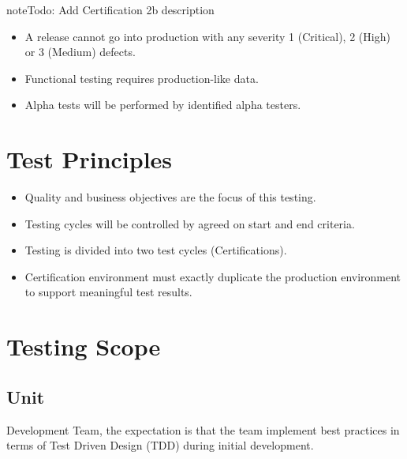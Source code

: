 \documentclass[letterpaper,10pt,english]{sphinxmanual}
\begin{document}
\begin{sphinxadmonition}{note}{\label{test_plan/strategy:index-0}Todo:}
Add Certification 2b description
\end{sphinxadmonition}
\begin{itemize}
\item {} 
A release cannot go into production with any severity 1 (Critical), 2 (High) or 3 (Medium) defects.

\item {} 
Functional testing requires production-like data.

\item {} 
Alpha tests will be performed by identified alpha testers.

\end{itemize}


\section{Test Principles}
\label{\detokenize{test_plan/strategy:test-principles}}\begin{itemize}
\item {} 
Quality and business objectives are the focus of this testing.

\item {} 
Testing cycles will be controlled by agreed on start and end criteria.

\item {} 
Testing is divided into two test cycles (Certifications).

\item {} 
Certification environment must exactly duplicate the production environment to support meaningful test results.

\end{itemize}


\section{Testing Scope}
\label{\detokenize{test_plan/strategy:testing-scope}}

\subsection{Unit}
\label{\detokenize{test_plan/strategy:unit}}
 Development Team, the expectation is that the team implement best practices in terms of Test Driven Design (TDD) during initial development.
\end{document}
